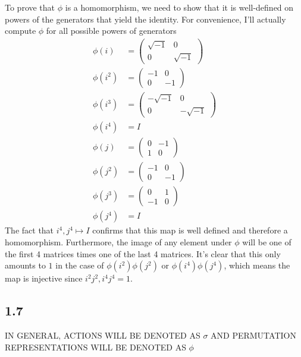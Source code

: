 \documentclass{article}
\begin{document}
\subsubsection{}\label{ex6p26}
To prove that $\phi$ is a homomorphism, we need to show that it is well-defined on powers of the generators that yield the identity. For convenience, I'll actually compute $\phi$ for all possible powers of generators
\begin{align*}
\phi(i) &= 
\begin{pmatrix}
\sqrt{-1} 	& 0\\
0			& \sqrt{-1}
\end{pmatrix}\\
\phi(i^2) &= 
\begin{pmatrix}
-1 	& 0\\
0	& -1
\end{pmatrix}\\
\phi(i^3) &= 
\begin{pmatrix}
-\sqrt{-1} 	& 0\\
0	& -\sqrt{-1}
\end{pmatrix}\\
\phi(i^4) &= I\\
\phi(j) &= 
\begin{pmatrix}
0 	&	-1\\
1	&	0
\end{pmatrix}\\
\phi(j^2) &= 
\begin{pmatrix}
-1 	&	0\\
0	&	-1
\end{pmatrix}\\
\phi(j^3) &= 
\begin{pmatrix}
0	&	1\\
-1	&	0
\end{pmatrix}\\
\phi(j^4) &= I
\end{align*}
The fact that $i^4,j^4 \mapsto I$ confirms that this map is well defined and therefore a homomorphism. Furthermore, the image of any element under $\phi$ will be one of the first 4 matrices times one of the last 4 matrices. It's clear that this only amounts to $1$ in the case of $\phi(i^2)\phi(j^2)$ or $\phi(i^4)\phi(j^4)$, which means the map is injective since $i^2j^2,i^4j^4=1$.
\subsection*{1.7}
IN GENERAL, ACTIONS WILL BE DENOTED AS $\sigma$ AND PERMUTATION REPRESENTATIONS WILL BE DENOTED AS $\phi$
\end{document}
